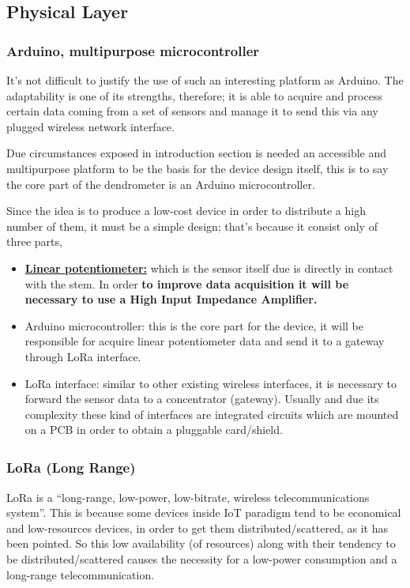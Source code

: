\documentclass[11pt,a4paper,dvipsnames,twoside]{article}
\newcommand{\doubt}[1] {\textbf{\color{Red3}#1}}
\begin{document}
\subsection{Physical Layer}

\subsubsection{Arduino, multipurpose microcontroller}
It's not difficult to justify the use of such an interesting platform as Arduino. The adaptability is one of its strengths, therefore; it is able to acquire and process certain data coming from a set of sensors and manage it to send this via any plugged wireless network interface.

Due circumstances exposed in introduction section is needed an accessible and multipurpose platform to be the basis for the device design itself, this is to say the core part of the dendrometer is an Arduino microcontroller.  

Since the idea is to produce a low-cost device in order to distribute a high number of them, it must be a simple design; that's because it consist only of three parts,

\begin{itemize}
  \item \href{https://es.rs-online.com/web/p/products/0317780/}{\doubt{Linear potentiometer:}} which is the sensor itself due is directly in contact with the stem. In order \doubt{to improve data acquisition it will be necessary to use a High Input Impedance Amplifier.}
  \item Arduino microcontroller: this is the core part for the device, it will be responsible for acquire linear potentiometer data and send it to a gateway through LoRa interface. 
  \item LoRa interface: similar to other existing wireless interfaces, it is necessary to forward the sensor data to a concentrator (gateway). Usually and due its complexity these kind of interfaces are integrated circuits which are mounted on a PCB in order to obtain a pluggable card/shield. 
\end{itemize}

\subsubsection{\texorpdfstring{LoRa\textsuperscript{\textregistered} (Lo{\normalfont\sffamily ng} Ra{\normalfont\sffamily nge})}{LoRa® (Long Range)}}
LoRa is a \enquote{long-range, low-power, low-bitrate, wireless telecommunications system}\cite[]{LoRaGeneral}. This is because some devices inside IoT paradigm tend to be economical and low-resources devices, in order to get them distributed/scattered, as it has been pointed. So this low availability (of resources) along with their tendency to be distributed/scattered causes the necessity for a low-power consumption and a long-range telecommunication.
\end{document}
